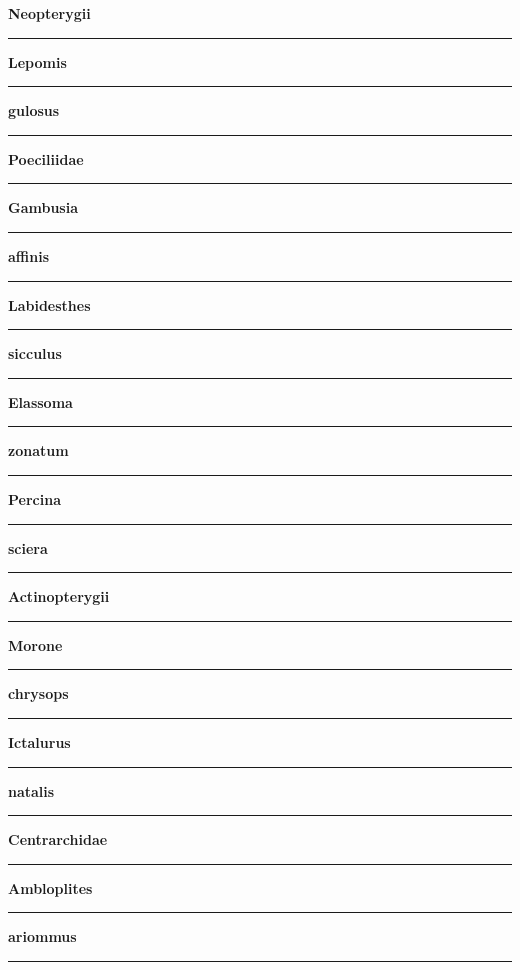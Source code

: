 \documentclass[11pt]{exam}
\newcommand*\Matching[1]{
\ifprintanswers
	\textbf{#1}
\else
	\rule{2.1in}{0.4pt}
\fi
}
\newlength\matchlena
\newlength\matchlenb
\newcommand\MatchQuestion[2]{%
	\setlength\matchlenb{\linewidth}
	\addtolength\matchlenb{-\matchlena}
	\parbox[t]{\matchlena}{\Matching{#1}}\enspace\parbox[t]{\matchlenb}{#2}}
\newlength\eclength
\newcommand*\ECQuestion[2]{%
	\setlength\matchlenb{\linewidth}
	\addtolength\matchlenb{-\eclength}
	\hspace{-0.24in}\textsc{ec}.\enspace\parbox[t]{\eclength}{\Matching{#1}}\enspace\parbox[t]{\matchlenb}{#2}}
\begin{document}
\begin{questions}
\begin{multicols}{2}

\question\MatchQuestion{Neopterygii}{}
\vspace{1.5\baselineskip}

\question\MatchQuestion{Lepomis}{}
\vspace{1.5\baselineskip}

\question\MatchQuestion{gulosus}{}
\vspace{1.5\baselineskip}

\question\MatchQuestion{Poeciliidae}{}
\vspace{1.5\baselineskip}

\question\MatchQuestion{Gambusia}{}
\vspace{1.5\baselineskip}

\question\MatchQuestion{affinis}{}
\vspace{1.5\baselineskip}

\question\MatchQuestion{Labidesthes}{}
\vspace{1.5\baselineskip}

\question\MatchQuestion{sicculus}{}
\vspace{1.5\baselineskip}

\question\MatchQuestion{Elassoma}{}
\vspace{1.5\baselineskip}

\question\MatchQuestion{zonatum}{}
\columnbreak

\question\MatchQuestion{Percina}{}
\vspace{1.5\baselineskip}

\question\MatchQuestion{sciera}{}
\vspace{1.5\baselineskip}

\question\MatchQuestion{Actinopterygii}{}
\vspace{1.5\baselineskip}

\question\MatchQuestion{Morone}{}
\vspace{1.5\baselineskip}

\question\MatchQuestion{chrysops}{}
\vspace{1.5\baselineskip}

\question\MatchQuestion{Ictalurus}{}
\vspace{1.5\baselineskip}

\question\MatchQuestion{natalis}{}
\vspace{1.5\baselineskip}

\question\MatchQuestion{Centrarchidae}{}
\vspace{1.5\baselineskip}

\question\MatchQuestion{Ambloplites}{}
\vspace{1.5\baselineskip}

\question\MatchQuestion{ariommus}{}


\end{multicols}

\end{questions}
\end{document}
